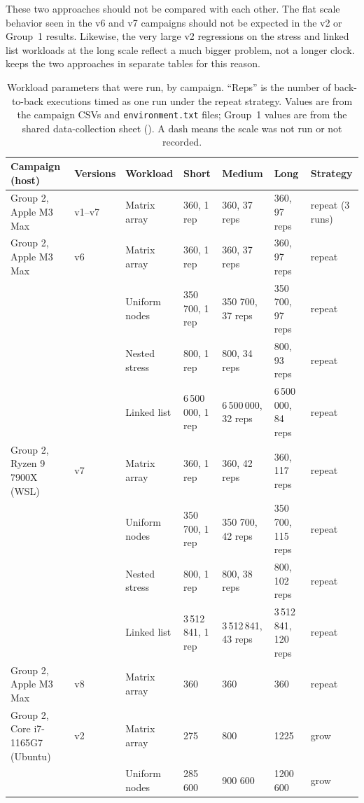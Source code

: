 These two approaches should not be compared with each other.
The flat scale behavior seen in the v6 and v7 campaigns should not be expected
in the v2 or Group~1 results.
Likewise, the very large v2 regressions on the stress and linked list
workloads at the long scale reflect a much bigger problem, not a longer clock.
 keeps the two approaches in separate tables for
this reason.

\begin{table}[!t]
\centering
\caption{Workload parameters that were run, by campaign. ``Reps'' is the
number of back-to-back executions timed as one run under the repeat strategy.
Values are from the campaign CSVs and \texttt{environment.txt} files; Group~1
values are from the shared data-collection sheet
(). A dash means the scale was not run or not
recorded.}
\label{tab:workload-parameters}
\footnotesize
\setlength{\tabcolsep}{4pt}
\begin{tabularx}{\textwidth}{@{}l l l L L L l@{}}
\toprule
Campaign (host) & Versions & Workload & Short & Medium & Long & Strategy \\
\midrule
Group 2, Apple M3 Max & v1--v7 & Matrix array & 360, 1 rep & 360, 37 reps & 360, 97 reps & repeat (3 runs) \\
Group 2, Apple M3 Max & v6 & Matrix array & 360, 1 rep & 360, 37 reps & 360, 97 reps & repeat \\
 & & Uniform nodes & 350 700, 1 rep & 350 700, 37 reps & 350 700, 97 reps & repeat \\
 & & Nested stress & 800, 1 rep & 800, 34 reps & 800, 93 reps & repeat \\
 & & Linked list & 6\,500\,000, 1 rep & 6\,500\,000, 32 reps & 6\,500\,000, 84 reps & repeat \\
Group 2, Ryzen 9 7900X (WSL) & v7 & Matrix array & 360, 1 rep & 360, 42 reps & 360, 117 reps & repeat \\
 & & Uniform nodes & 350 700, 1 rep & 350 700, 42 reps & 350 700, 115 reps & repeat \\
 & & Nested stress & 800, 1 rep & 800, 38 reps & 800, 102 reps & repeat \\
 & & Linked list & 3\,512\,841, 1 rep & 3\,512\,841, 43 reps & 3\,512\,841, 120 reps & repeat \\
Group 2, Apple M3 Max & v8 & Matrix array & 360 & 360 & 360 & repeat \\
Group 2, Core i7-1165G7 (Ubuntu) & v2 & Matrix array & 275 & 800 & 1225 & grow \\
 & & Uniform nodes & 285 600 & 900 600 & 1200 600 & grow \\

\end{tabularx}
\end{table}

